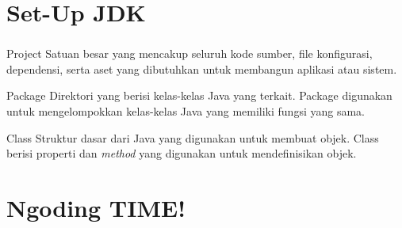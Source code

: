 \documentclass[aspectratio=169]{beamer}
\theoremstyle{definition}
\begin{document}
    \section{Set-Up JDK}
    \begin{frame}
        \frametitle{\insertsection}
        \begin{exampleblock}{Project}
            Satuan besar yang mencakup seluruh kode sumber, file konfigurasi, dependensi, serta aset yang dibutuhkan untuk membangun aplikasi atau sistem.
        \end{exampleblock}
        \begin{exampleblock}{Package}
            Direktori yang berisi kelas-kelas Java yang terkait. Package digunakan untuk mengelompokkan kelas-kelas Java yang memiliki fungsi yang sama.
        \end{exampleblock}
        \begin{exampleblock}{Class}
            Struktur dasar dari Java yang digunakan untuk membuat objek. Class berisi properti dan \textit{method} yang digunakan untuk mendefinisikan objek.
        \end{exampleblock}
    \end{frame}

    \section{Ngoding TIME!}
\end{document}
